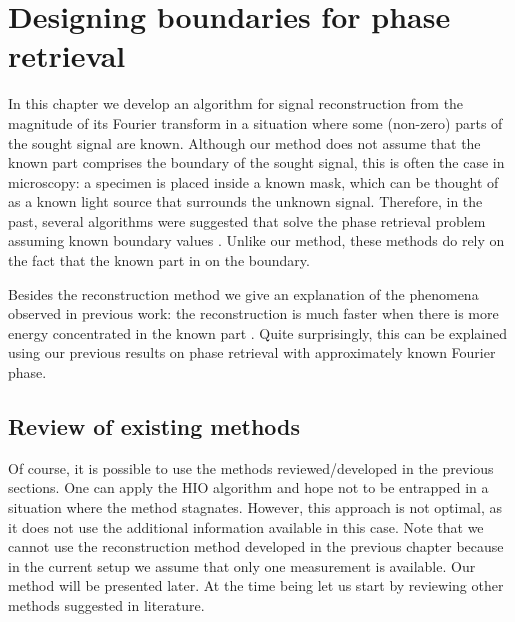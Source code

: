 \chapter{Designing boundaries for phase retrieval\footnotemark}
\label{cha:design-bound-phase}


In this chapter we develop an algorithm for signal reconstruction from
the magnitude of its Fourier transform in a situation where some
(non-zero) parts of the sought signal are known. Although our method
does not assume that the known part comprises the boundary of the
sought signal, this is often the case in microscopy: a specimen is
placed inside a known mask, which can be thought of as a known light source
that surrounds the unknown signal. Therefore, in the past, several
algorithms were suggested that solve the phase retrieval problem
assuming known boundary values
.
Unlike
our method, these methods do rely on the fact that the known part in
on the boundary.

Besides the reconstruction method we give an explanation of the
phenomena observed in previous work: the reconstruction is much faster
when there is more energy concentrated in the known part
. Quite surprisingly, this can be
explained using our previous results on phase retrieval with
approximately known Fourier phase. 



\section{Review of existing methods}
\label{sec:revi-exist-meth}
Of course, it is possible to use the methods reviewed/developed in the
previous sections. One can apply the HIO algorithm and hope not to be
entrapped in a situation where the method stagnates. However,
this approach is not optimal, as it does not use the additional
information available in this case.
Note that we cannot  use the
reconstruction method developed in the previous chapter because
in the current setup we assume that only one measurement is
available. Our method will be presented later. At the time being let us start by
reviewing other methods suggested in literature.

